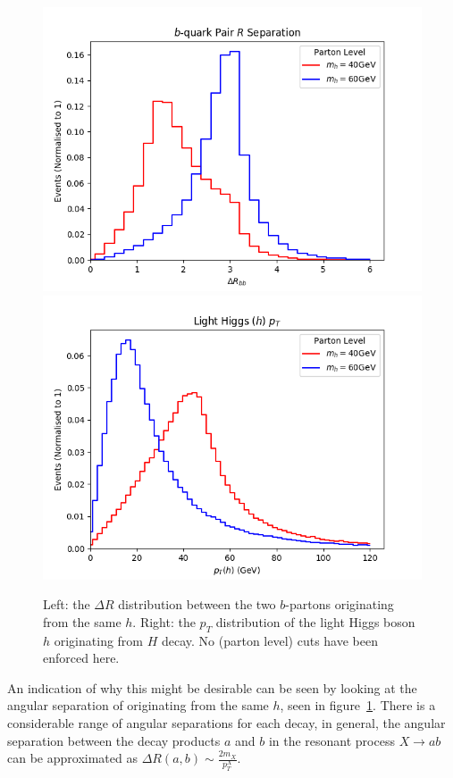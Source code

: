 \begin{figure}[htb!]
	\begin{center}
	\includegraphics[scale=0.42]{plots/parton/delRbb.png}
	\includegraphics[scale=0.42]{plots/parton/LHiggs_pt.png}
	 \end{center}
	\caption{Left: the $\Delta R$ distribution between the
two $b$-partons originating from the same $h$.
Right: the $p_T$ distribution of the light Higgs boson $h$ originating from $H$ decay.
No (parton level) cuts have been enforced here. }
\label{fig:parton_higgs}
\end{figure}

An indication of why this might be desirable can be seen by
looking at the angular separation of  originating from the 
same \(h\), seen in figure~\ref{fig:parton_higgs}.
There is a considerable range of angular separations for each decay,
in general, the angular separation between the decay products $a$ and $b$  in the resonant process
$X \to a b$ can be approximated as $\Delta R (a,b) \sim \frac{2 m_{X}}{p^{X}_T}$.

